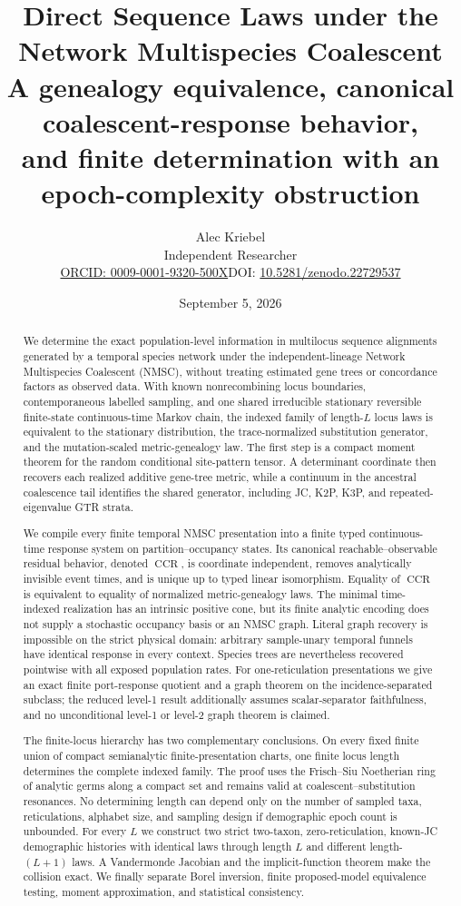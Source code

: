 \documentclass[11pt]{article}
\title{\textbf{Direct Sequence Laws under the Network Multispecies Coalescent}\\[4pt]
A genealogy equivalence, canonical coalescent-response behavior,\\
and finite determination with an epoch-complexity obstruction}
\author{Alec Kriebel\\Independent Researcher\\
\small\href{https://orcid.org/0009-0001-9320-500X}{ORCID: 0009-0001-9320-500X}\quad DOI: \href{https://doi.org/10.5281/zenodo.22729537}{10.5281/zenodo.22729537}}
\date{September 5, 2026}
\newcommand{\CCR}{\operatorname{CCR}}
\begin{document}
\maketitle

\begin{abstract}
We determine the exact population-level information in multilocus sequence alignments generated by a temporal species network under the independent-lineage Network Multispecies Coalescent (NMSC), without treating estimated gene trees or concordance factors as observed data.  With known nonrecombining locus boundaries, contemporaneous labelled sampling, and one shared irreducible stationary reversible finite-state continuous-time Markov chain, the indexed family of length-$L$ locus laws is equivalent to the stationary distribution, the trace-normalized substitution generator, and the mutation-scaled metric-genealogy law.  The first step is a compact moment theorem for the random conditional site-pattern tensor.  A determinant coordinate then recovers each realized additive gene-tree metric, while a continuum in the ancestral coalescence tail identifies the shared generator, including JC, K2P, K3P, and repeated-eigenvalue GTR strata.

We compile every finite temporal NMSC presentation into a finite typed continuous-time response system on partition--occupancy states.  Its canonical reachable--observable residual behavior, denoted $\CCR$, is coordinate independent, removes analytically invisible event times, and is unique up to typed linear isomorphism.  Equality of $\CCR$ is equivalent to equality of normalized metric-genealogy laws.  The minimal time-indexed realization has an intrinsic positive cone, but its finite analytic encoding does not supply a stochastic occupancy basis or an NMSC graph.  Literal graph recovery is impossible on the strict physical domain: arbitrary sample-unary temporal funnels have identical response in every context.  Species trees are nevertheless recovered pointwise with all exposed population rates.  For one-reticulation presentations we give an exact finite port-response quotient and a graph theorem on the incidence-separated subclass; the reduced level-1 result additionally assumes scalar-separator faithfulness, and no unconditional level-1 or level-2 graph theorem is claimed.

The finite-locus hierarchy has two complementary conclusions.  On every fixed finite union of compact semianalytic finite-presentation charts, one finite locus length determines the complete indexed family.  The proof uses the Frisch--Siu Noetherian ring of analytic germs along a compact set and remains valid at coalescent--substitution resonances.  No determining length can depend only on the number of sampled taxa, reticulations, alphabet size, and sampling design if demographic epoch count is unbounded.  For every $L$ we construct two strict two-taxon, zero-reticulation, known-JC demographic histories with identical laws through length $L$ and different length-$(L+1)$ laws.  A Vandermonde Jacobian and the implicit-function theorem make the collision exact.  We finally separate Borel inversion, finite proposed-model equivalence testing, moment approximation, and statistical consistency.
\end{abstract}
\end{document}
